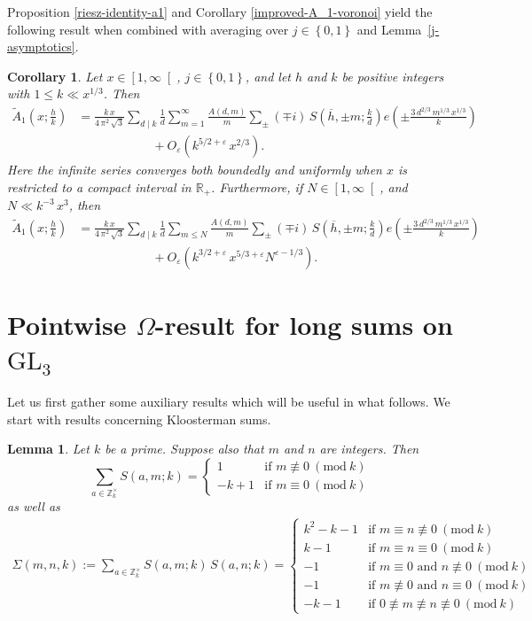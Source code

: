 \documentclass[a4paper,10pt,twoside]{amsart}
\newtheorem{corollary}[theorem]{Corollary}
\newtheorem{lemma}[theorem]{Lemma}
\theoremstyle{definition}
\numberwithin{equation}{section}
\newcommand\eps{\varepsilon}
\renewcommand{\pmod}[1]{\ (\mathrm{mod}\ #1)}
\renewcommand\:{\colon}
\begin{document}
\noindent Proposition \ref{riesz-identity-a1} and Corollary \ref{improved-A_1-voronoi} yield the following result when combined with averaging over $j\in\left\{0,1\right\}$ and Lemma~\ref{j-asymptotics}.
\begin{corollary}\label{sharpcutoff-voronoi}
Let $x\in\left[1,\infty\right[$, $j\in\left\{0,1\right\}$, and let $h$ and $k$ be positive integers with $1\leqslant k\ll x^{1/3}$. Then
\begin{align*}   
\widetilde A_{1}\!\left(x;\frac hk\right)
&=\frac{k\,x}{4\,\pi^2\,\sqrt3}\sum_{d\mid k}\frac1{d}\sum_{m=1}^\infty\frac{A(d,m)}{m}\sum_\pm \left(\mp i\right)\,S\!\left(\overline h,\pm m;\frac kd\right)e\!\left(\pm\frac{3\,d^{2/3}\,m^{1/3}\,x^{1/3}}{k}\right)\\
&\qquad\qquad\qquad+O_\eps\left(k^{5/2+\eps}\,x^{2/3}\right).
\end{align*}
Here the infinite series converges both boundedly and uniformly when $x$ is restricted to a compact interval in $\mathbb R_+$. Furthermore, if $N\in\left[1,\infty\right[$, and $N\ll k^{-3}\,x^3$, then
\begin{align*}
\widetilde A_{1}\!\left(x;\frac hk\right)
&=\frac{k\,x}{4\,\pi^2\,\sqrt3}\sum_{d\mid k}\frac1{d}\sum_{m\leqslant N}\frac{A(d,m)}{m}\sum_\pm \left(\mp i\right)\,S\!\left(\overline h,\pm m;\frac kd\right)e\!\left(\pm\frac{3\,d^{2/3}\,m^{1/3}\,x^{1/3}}{k}\right)\\
&\qquad\qquad\qquad+O_\eps\left(k^{3/2+\eps}\,x^{5/3+\eps}N^{\eps-1/3}\right).
\end{align*}
\end{corollary}    

\section{Pointwise $\Omega$-result for long sums on $\mathrm{GL}_3$}

\noindent Let us first gather some auxiliary results which will be useful in what follows. We start with results concerning Kloosterman sums.
\begin{lemma}\label{Kloosterman-correlation}
Let $k$ be a prime. Suppose also that $m$ and $n$ are integers. Then
\[\sum_{a\in\mathbb Z_k^\times}S(a,m;k)=\begin{cases}1&\text{if $m\not\equiv0\pmod k$}\\
-k+1&\text{if $m\equiv0\pmod k$}
\end{cases}\]
as well as
\begin{align*}
\Sigma(m,n,k):=\sum_{a\in\mathbb Z_k^\times} S(a,m;k)\,S(a,n;k)=\begin{cases}
k^2-k-1&\text{if $m\equiv n\not\equiv0\pmod k$}\\
k-1&\text{if $m\equiv n\equiv0\pmod k$}\\
-1&\text{if $m\equiv0$ and $n\not\equiv0\pmod k$}\\
-1&\text{if $m\not\equiv0$ and $n\equiv0\pmod k$}\\
-k-1&\text{if $0\not\equiv m\not\equiv n\not\equiv0\pmod k$}
\end{cases}    
\end{align*}
\end{lemma} 
\end{document}

